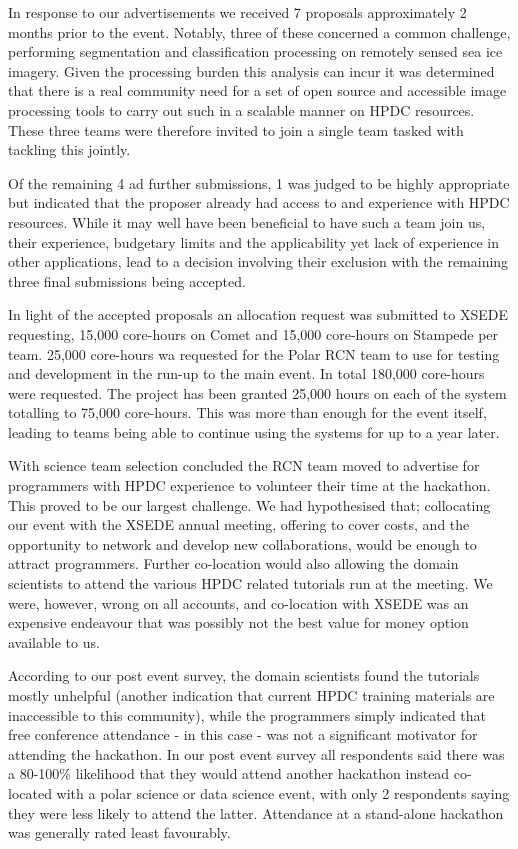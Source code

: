 \documentclass[conference]{IEEEtran}
\begin{document}
In response to our advertisements we received 7 proposals approximately 2 months prior to the event.  Notably, three of these concerned a common challenge, performing segmentation and classification processing on remotely sensed sea ice imagery.   Given the processing burden this analysis can incur it was determined that there is a real community need for a set of open source and accessible image processing tools to carry out such in a scalable manner on HPDC resources.  These three teams were therefore invited to join a single team tasked with tackling this jointly.  

Of the remaining 4 ad further submissions, 1 was judged to be highly appropriate but indicated that the proposer already had access to and experience with HPDC resources.  While it may well have been beneficial to have such a team join us, their experience, budgetary limits and the applicability yet lack of experience in other applications, lead to a decision involving their exclusion with the remaining three final submissions being accepted.  

In light of the accepted proposals an allocation request was submitted to XSEDE requesting, 
15,000 core-hours on Comet and 15,000 core-hours on Stampede per team.  25,000 core-hours wa requested for the Polar RCN team to use for testing and development in the run-up to the main event.  In total 180,000 core-hours were requested.   The project has been granted 25,000 hours on each of the system totalling to 75,000 core-hours. This was more than enough for the event itself, leading to teams being able to continue using the systems for up to a year later.

With science team selection concluded the RCN team moved to advertise for programmers with HPDC experience to volunteer their time at the hackathon.  This proved to be our largest challenge.  We had hypothesised that; collocating our event with the XSEDE annual meeting, offering to cover costs, and the opportunity to network and develop new collaborations, would be enough to attract programmers.  Further co-location would also allowing the domain scientists to attend the various HPDC related tutorials run at the meeting.  We were, however, wrong on all accounts, and co-location with XSEDE was an expensive endeavour that was possibly not the best value for money option available to us.  

According to our post event survey, the domain scientists found the tutorials mostly unhelpful (another indication that current HPDC training materials are inaccessible to this community), while the programmers simply indicated that free conference attendance - in this case - was not a significant motivator for attending the hackathon.  In our post event survey all respondents said there was a 80-100\% likelihood that they would attend another hackathon instead co-located with a polar science or data science event, with only 2 respondents saying they were less likely to attend the latter. Attendance at a stand-alone hackathon was generally rated least favourably.
\end{document}
